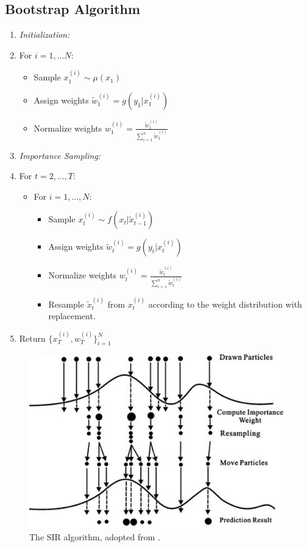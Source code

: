 \documentclass{article}
\begin{document}
\subsection{Bootstrap Algorithm}
\begin{enumerate}
\item \textit{Initialization:}
\item[] For $i=1,\dots N$:
\begin{itemize}
\item[] Sample $x_1^{(i)} \sim \mu(x_1)$
\item[] Assign weights $\widetilde{w}_1^{(i)} = g(y_1|x_1^{(i)})$
\item[] Normalize weights $w_1^{(i)} = \frac{\widetilde{w}_1^{(i)}}{\sum_{i=1}^{n} \widetilde{w}_1^{(i)}}$
\end{itemize}
\item \textit{Importance Sampling:}
\item[] For $t=2,\dots,T$:
\begin{itemize}
\item[] For $i=1,\dots,N$:
\begin{itemize}
\item[] Sample $x_t^{(i)} \sim f(x_t|\widetilde{x}_{t-1}^{(i)})$
\item[] Assign weights $\widetilde{w}_t^{(i)} = g(y_t|x_t^{(i)})$
\item[] Normalize weights $w_t^{(i)} = \frac{\widetilde{w}_t^{(i)}}{\sum_{i=1}^{n} \widetilde{w}_t^{(i)}}$
\item[] Resample $\widetilde{x}_t^{(i)}$ from $x_t^{(i)}$ according to the weight distribution with replacement.
\end{itemize}
\end{itemize}
\item Return $\{x_T^{(i)},w_T^{(i)}\}_{i=1}^N$
\end{enumerate}

\begin{figure}
\centering
\includegraphics[scale=.25]{sir}
\caption{The SIR algorithm, adopted from \cite{sirfig}.}
\label{fig:sir}
\end{figure}
\end{document}
